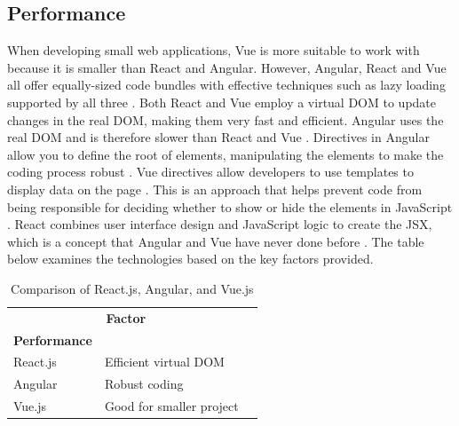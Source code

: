 \documentclass[10pt,journal,compsoc]{IEEEtran}
\begin{document}
\subsection{Performance}
When developing small web applications, Vue is more suitable to work with because it is smaller than React and Angular. However, Angular, React and Vue all offer equally-sized code bundles with effective techniques such as lazy loading supported by all three  \cite{vyas2022comparative}. Both React and Vue employ a virtual DOM to update changes in the real DOM, making them very fast and efficient. Angular uses the real DOM and is therefore slower than React and Vue \cite{vyas2022comparative}. Directives in Angular allow you to define the root of elements, manipulating the elements to make the coding process robust \cite{branas2014angularjs}. Vue directives allow developers to use templates to display data on the page \cite{macrae2018vue}. This is an approach that helps prevent code from being responsible for deciding whether to show or hide the elements in JavaScript \cite{macrae2018vue}. React combines user interface design and JavaScript logic to create the JSX, which is a concept that Angular and Vue have never done before \cite{vyas2022comparative}. The table below examines the technologies based on the key factors provided.

\begin{table}[ht]
    \centering
    \begin{tabular}{llr}
        \hline
        \multicolumn{2}{c}{\textbf{Factor}} \\
        \cline{1-2}
        \textbf{Performance} & \\
        React.js & Efficient virtual DOM \cite{vyas2022comparative}\\
        Angular & Robust coding \cite{branas2014angularjs}\\
        Vue.js & Good for smaller project\cite{vyas2022comparative}\\
        \hline
    \end{tabular}
    \caption{Comparison of React.js, Angular, and Vue.js}
    \label{tab:comparison}
\end{table}
\end{document}

